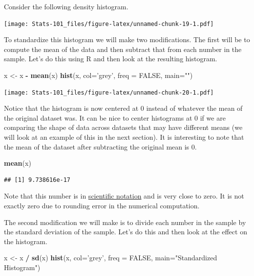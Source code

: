 \documentclass[]{book}
\newenvironment{Shaded}{\begin{snugshade}}{\end{snugshade}}
\newcommand{\DataTypeTok}[1]{\textcolor[rgb]{0.13,0.29,0.53}{#1}}
\newcommand{\KeywordTok}[1]{\textcolor[rgb]{0.13,0.29,0.53}{\textbf{#1}}}
\newcommand{\NormalTok}[1]{#1}
\newcommand{\OperatorTok}[1]{\textcolor[rgb]{0.81,0.36,0.00}{\textbf{#1}}}
\newcommand{\OtherTok}[1]{\textcolor[rgb]{0.56,0.35,0.01}{#1}}
\newcommand{\StringTok}[1]{\textcolor[rgb]{0.31,0.60,0.02}{#1}}
\begin{document}
Consider the following density histogram.

\texttt{[image: Stats-101\_files/figure-latex/unnamed-chunk-19-1.pdf]}

To standardize this histogram we will make two modifications. The first will be to compute the mean of the data and then subtract that from each number in the sample. Let's do this using R and then look at the resulting histogram.

\begin{Shaded}
\begin{Highlighting}[]
\NormalTok{x <-}\StringTok{ }\NormalTok{x }\OperatorTok{-}\StringTok{ }\KeywordTok{mean}\NormalTok{(x)}
\KeywordTok{hist}\NormalTok{(x, }\DataTypeTok{col=}\StringTok{'grey'}\NormalTok{, }\DataTypeTok{freq =} \OtherTok{FALSE}\NormalTok{, }\DataTypeTok{main=}\StringTok{""}\NormalTok{)}
\end{Highlighting}
\end{Shaded}

\texttt{[image: Stats-101\_files/figure-latex/unnamed-chunk-20-1.pdf]}

Notice that the histogram is now centered at \(0\) instead of whatever the mean of the original dataset was. It can be nice to center histograms at \(0\) if we are comparing the shape of data across datasets that may have different means (we will look at an example of this in the next section). It is interesting to note that the mean of the dataset after subtracting the original mean is \(0\).

\begin{Shaded}
\begin{Highlighting}[]
\KeywordTok{mean}\NormalTok{(x)}
\end{Highlighting}
\end{Shaded}

\begin{verbatim}
## [1] 9.738616e-17
\end{verbatim}

Note that this number is in \href{https://en.wikipedia.org/wiki/Scientific_notation}{scientific notation} and is very close to zero. It is not exactly zero due to rounding error in the numerical computation.

The second modification we will make is to divide each number in the sample by the standard deviation of the sample. Let's do this and then look at the effect on the histogram.

\begin{Shaded}
\begin{Highlighting}[]
\NormalTok{x <-}\StringTok{ }\NormalTok{x }\OperatorTok{/}\StringTok{ }\KeywordTok{sd}\NormalTok{(x)}
\KeywordTok{hist}\NormalTok{(x, }\DataTypeTok{col=}\StringTok{'grey'}\NormalTok{, }\DataTypeTok{freq =} \OtherTok{FALSE}\NormalTok{, }\DataTypeTok{main=}\StringTok{"Standardized Histogram"}\NormalTok{)}
\end{Highlighting}
\end{Shaded}
\end{document}
